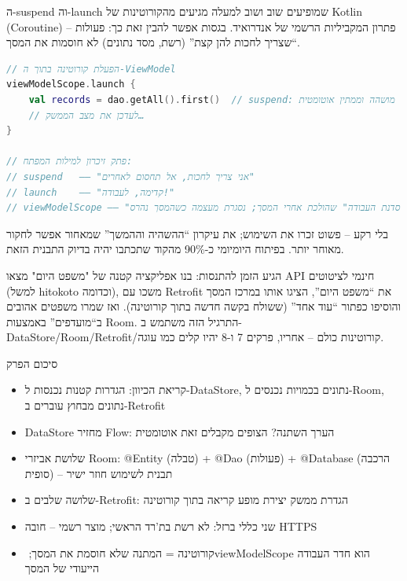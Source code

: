 ה-suspend וה-launch שמופיעים שוב ושוב למעלה מגיעים מהקורוטינות של Kotlin (Coroutine) – פתרון המקביליות הרשמי של אנדרואיד. בגסות אפשר להבין זאת כך: פעולות “שצריך לחכות להן קצת” (רשת, מסד נתונים) לא חוסמות את המסך.

\begin{lstlisting}[language=Kotlin]
// הפעלת קורוטינה בתוך ה-ViewModel
viewModelScope.launch {
    val records = dao.getAll().first()  // suspend: מושהה וממתין אוטומטית
    // לעדכן את מצב הממשק…
}

// פתק זיכרון למילות המפתח:
// suspend   —— "אני צריך לחכות, אל תחסום לאחרים"
// launch    —— "קדימה, לעבודה!"
// viewModelScope —— "סדנת העבודה" שהולכת אחרי המסך; נסגרת מעצמה כשהמסך נהרס
\end{lstlisting}

בלי רקע – פשוט זכרו את השימוש; את עיקרון “ההשהיה וההמשך” שמאחור אפשר לחקור מאוחר יותר. בפיתוח היומיומי כ-90\% מהקוד שתכתבו יהיה בדיוק התבנית הזאת.

\begin{tcbpractice}{הגיע הזמן להתנסות: בנו אפליקציה קטנה של "משפט היום"}
מצאו API חינמי לציטוטים (למשל hitokoto וכדומה), משכו עם Retrofit את “משפט היום”, הציגו אותו במרכז המסך והוסיפו כפתור “עוד אחד” (ששולח בקשה חדשה בתוך קורוטינה). ואז שמרו משפטים אהובים ב“מועדפים” באמצעות Room. התרגיל הזה משתמש ב-DataStore/Room/Retrofit/קורוטינות כולם – אחריו, פרקים 7 ו-8 יהיו קלים כמו עוגה.

\end{tcbpractice}

\begin{tcbsummary}{סיכום הפרק}
\begin{itemize}
  \item קריאת הכיוון: הגדרות קטנות נכנסות ל-DataStore, נתונים בכמויות נכנסים ל-Room, נתונים מבחוץ עוברים ב-Retrofit
  \item ‏DataStore מחזיר Flow: הערך השתנה? הצופים מקבלים זאת אוטומטית
  \item שלושת אביזרי Room: ‏@Entity (טבלה) + ‏@Dao (פעולות) + ‏@Database (הרכבה סופית) – תבנית לשימוש חוזר ישיר
  \item שלושה שלבים ב-Retrofit: הגדרת ממשק יצירת מופע קריאה בתוך קורוטינה
  \item שני כללי ברזל: לא רשת בת'רד הראשי; מוצר רשמי – חובה HTTPS
  \item קורוטינה = המתנה שלא חוסמת את המסך; ‏viewModelScope הוא חדר העבודה הייעודי של המסך
\end{itemize}

\end{tcbsummary}
